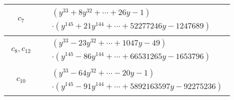 \documentclass[1p]{elsarticle_modified}
\theoremstyle{definition}
\begin{document}
\begin{tabular}{m{50pt}|m{274pt}}
\hline $$\begin{aligned}c_{7}\end{aligned}$$&$\begin{aligned}
&(y^{33}+8 y^{32}+\cdots+26 y-1)\\
&\cdot(y^{145}+21 y^{144}+\cdots+52277246 y-1247689)
\end{aligned}$\\
\hline $$\begin{aligned}c_{8},c_{12}\end{aligned}$$&$\begin{aligned}
&(y^{33}-23 y^{32}+\cdots+1047 y-49)\\
&\cdot(y^{145}-86 y^{144}+\cdots+66531265 y-1653796)
\end{aligned}$\\
\hline $$\begin{aligned}c_{10}\end{aligned}$$&$\begin{aligned}
&(y^{33}-64 y^{32}+\cdots-20 y-1)\\
&\cdot(y^{145}-91 y^{144}+\cdots+5892163597 y-92275236)
\end{aligned}$\\
\hline
\end{tabular}
\vskip 2pc
\end{document}
